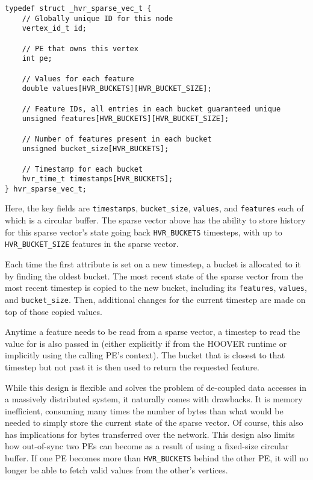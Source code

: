 \begin{verbatim}
typedef struct _hvr_sparse_vec_t {
    // Globally unique ID for this node
    vertex_id_t id;

    // PE that owns this vertex
    int pe;

    // Values for each feature
    double values[HVR_BUCKETS][HVR_BUCKET_SIZE];

    // Feature IDs, all entries in each bucket guaranteed unique
    unsigned features[HVR_BUCKETS][HVR_BUCKET_SIZE];

    // Number of features present in each bucket
    unsigned bucket_size[HVR_BUCKETS];

    // Timestamp for each bucket
    hvr_time_t timestamps[HVR_BUCKETS];
} hvr_sparse_vec_t;
\end{verbatim}

Here, the key fields are \texttt{timestamps}, \texttt{bucket\_size},
\texttt{values}, and \texttt{features} each of which is a circular buffer. The
sparse vector above has the ability to store history for this sparse vector's
state going back \texttt{HVR\_BUCKETS} timesteps, with up to
\texttt{HVR\_BUCKET\_SIZE} features in the sparse vector.

Each time the first attribute is set on a new timestep, a bucket is allocated to
it by finding the oldest bucket. The most recent state of the sparse vector from
the most recent timestep is copied to the new bucket, including its
\texttt{features}, \texttt{values}, and \texttt{bucket\_size}. Then, additional
changes for the current timestep are made on top of those copied values.

Anytime a feature needs to be read from a sparse vector, a timestep to read the
value for is also passed in (either explicitly if from the HOOVER runtime or
implicitly using the calling PE's context). The bucket that is closest to that
timestep but not past it is then used to return the requested feature.

While this design is flexible and solves the problem of de-coupled data accesses
in a massively distributed system, it naturally comes with drawbacks. It is
memory inefficient, consuming many times the number of bytes than
what would be needed to simply store the current state of the sparse vector. Of
course, this also has implications for bytes transferred over the network. This
design also limits how out-of-sync two PEs can become as a result of using a
fixed-size circular buffer. If one PE becomes more than \texttt{HVR\_BUCKETS}
behind the other PE, it will no longer be able to fetch valid values from the
other's vertices.

